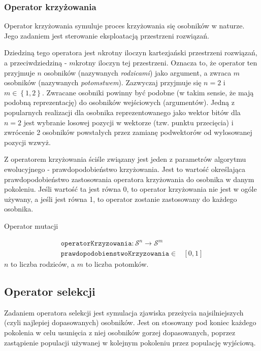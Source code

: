 \documentclass[twoside]{iisthesis}
\newcommand{\important}{\mathcal}
\newcommand{\param}{\mathtt}
\begin{document}
\subsubsection{Operator krzyżowania}

Operator krzyżowania symuluje proces krzyżowania się osobników w naturze. Jego zadaniem jest sterowanie eksploatacją przestrzeni rozwiązań.

Dziedziną tego operatora jest $n$krotny iloczyn kartezjański przestrzeni rozwiązań, a przeciwdziedziną - $m$krotny iloczyn tej przestrzeni. Oznacza to, że operator ten przyjmuje $n$ osobników (nazywanych \emph{rodzicami}) jako argument, a zwraca $m$ osobników (nazywanych \emph{potomstwem}). Zazwyczaj przyjmuje się $ n = 2 $ i $m \in \left\{1, 2 \right\}$. Zwracane osobniki powinny być podobne (w takim sensie, że mają podobną reprezentację) do osobników wejściowych (argumentów). Jedną z popularnych realizacji dla osobnika reprezentowanego jako wektor bitów dla $n=2$ jest wybranie losowej pozycji w wektorze (tzw. punktu przecięcia) i zwrócenie 2 osobników powstałych przez zamianę podwektorów od wylosowanej pozycji wzwyż.

Z operatorem krzyżowania ściśle związany jest jeden z parametrów algorytmu ewolucyjnego - prawdopodobieństwo krzyżowania. Jest to wartość określająca prawdopodobieństwo zastosowania operatora krzyżowania do osobnika w danym pokoleniu. Jeśli wartość ta jest równa 0, to operator krzyżowania nie jest w ogóle używany, a jeśli jest równa 1, to operator zostanie zastosowany do każdego osobnika.

\begin{signature}
	\caption{Operator mutacji \label{signature_mutation}}
	\begin{align}
	\param{operatorKrzyzowania}: \important{S}^n \rightarrow \important{S}^m \\
	\param{prawdopodobienstwoKrzyzowania} \in &[0, 1]
	\end{align}
	$n$ to liczba rodziców, a $m$ to liczba potomków.
\end{signature}	

\subsection{Operator selekcji} \label{subsection_natSel}

Zadaniem operatora selekcji jest symulacja zjawiska przeżycia najsilniejszych (czyli najlepiej dopasowanych) osobników. Jest on stosowany pod koniec każdego pokolenia w celu usunięcia z niej osobników gorzej dopasowanych, poprzez zastąpienie populacji używanej w kolejnym pokoleniu przez populację wyjściową.
\end{document}
